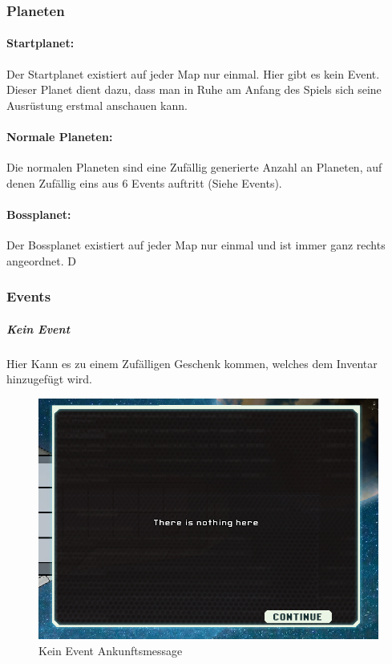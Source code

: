 \documentclass[fontsize=12pt,paper=a4,twoside]{scrartcl}
\begin{document}
\subsubsection{Planeten}

\paragraph{Startplanet: }
Der Startplanet existiert auf jeder Map nur einmal. Hier gibt es kein Event. Dieser Planet dient dazu, dass man in Ruhe am Anfang des Spiels sich seine Ausrüstung erstmal anschauen kann. 

\paragraph{Normale Planeten: }
Die normalen Planeten sind eine Zufällig generierte Anzahl an Planeten, auf denen Zufällig eins aus 6 Events auftritt (Siehe Events).

\paragraph{Bossplanet: }
Der Bossplanet existiert auf jeder Map nur einmal und ist immer ganz rechts angeordnet. D


\subsubsection{Events}

\subparagraph{Kein Event} Hier Kann es zu einem Zufälligen Geschenk kommen, welches dem Inventar hinzugefügt wird.

\begin{figure}[H]
\centering
\includegraphics[width=1\linewidth]{DasSpiel/Karte/nothing.png}
\caption{Kein Event Ankunftsmessage}
\end{figure}
 
\end{document}
